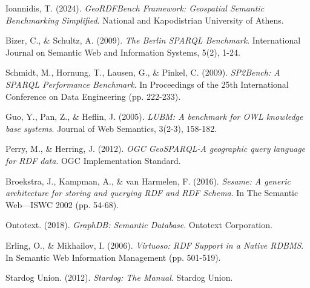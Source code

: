 \documentclass[11pt,a4paper]{article}
\begin{document}

\begin{thebibliography}{9}

Ioannidis, T. (2024). 
\textit{GeoRDFBench Framework: Geospatial Semantic Benchmarking Simplified}. 
National and Kapodistrian University of Athens.

Bizer, C., \& Schultz, A. (2009). 
\textit{The Berlin SPARQL Benchmark}. 
International Journal on Semantic Web and Information Systems, 5(2), 1-24.

Schmidt, M., Hornung, T., Lausen, G., \& Pinkel, C. (2009). 
\textit{SP2Bench: A SPARQL Performance Benchmark}. 
In Proceedings of the 25th International Conference on Data Engineering (pp. 222-233).

Guo, Y., Pan, Z., \& Heflin, J. (2005). 
\textit{LUBM: A benchmark for OWL knowledge base systems}. 
Journal of Web Semantics, 3(2-3), 158-182.

Perry, M., \& Herring, J. (2012). 
\textit{OGC GeoSPARQL-A geographic query language for RDF data}. 
OGC Implementation Standard.

Broekstra, J., Kampman, A., \& van Harmelen, F. (2016). 
\textit{Sesame: A generic architecture for storing and querying RDF and RDF Schema}. 
In The Semantic Web—ISWC 2002 (pp. 54-68).

Ontotext. (2018). 
\textit{GraphDB: Semantic Database}. 
Ontotext Corporation.

Erling, O., \& Mikhailov, I. (2006). 
\textit{Virtuoso: RDF Support in a Native RDBMS}. 
In Semantic Web Information Management (pp. 501-519).

Stardog Union. (2012). 
\textit{Stardog: The Manual}. 
Stardog Union.

\end{thebibliography}
\end{document}
